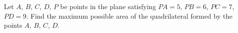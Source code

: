 Let $A$, $B$, $C$, $D$, $P$ be points in the plane satisfying $PA=5$, $PB=6$, $PC=7$, $PD=9$. Find the maximum possible area of the quadrilateral formed by the points $A$, $B$, $C$, $D$.
